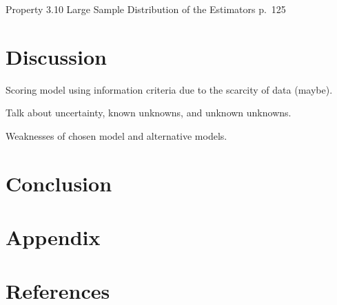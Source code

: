 \documentclass[]{article}
\begin{document}
Property 3.10 Large Sample Distribution of the Estimators p.~125

\hypertarget{discussion}{%
\section{Discussion}\label{discussion}}

Scoring model using information criteria due to the scarcity of data
(maybe).

Talk about uncertainty, known unknowns, and unknown unknowns.

Weaknesses of chosen model and alternative models.

\hypertarget{conclusion}{%
\section{Conclusion}\label{conclusion}}

\hypertarget{appendix}{%
\section{Appendix}\label{appendix}}

\hypertarget{references}{%
\section{References}\label{references}}
\end{document}
